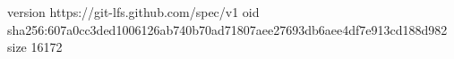 version https://git-lfs.github.com/spec/v1
oid sha256:607a0cc3ded1006126ab740b70ad71807aee27693db6aee4df7e913cd188d982
size 16172
